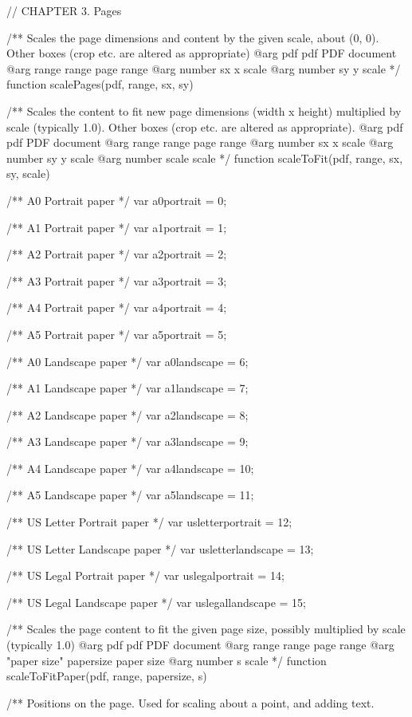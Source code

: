 // CHAPTER 3. Pages

/** Scales the page dimensions and content by the given scale, about (0, 0).
Other boxes (crop etc. are altered as appropriate)
@arg {pdf} pdf PDF document
@arg {range} range page range
@arg {number} sx x scale
@arg {number} sy y scale */
function scalePages(pdf, range, sx, sy) {}

/** Scales the content to fit new page dimensions (width x height) multiplied
by scale (typically 1.0). Other boxes (crop etc. are altered as appropriate).
@arg {pdf} pdf PDF document
@arg {range} range page range
@arg {number} sx x scale
@arg {number} sy y scale
@arg {number} scale scale */
function scaleToFit(pdf, range, sx, sy, scale) {}

/** A0 Portrait paper */
var a0portrait = 0;

/** A1 Portrait paper */
var a1portrait = 1;

/** A2 Portrait paper */
var a2portrait = 2;

/** A3 Portrait paper */
var a3portrait = 3;

/** A4 Portrait paper */
var a4portrait = 4;

/** A5 Portrait paper */
var a5portrait = 5;

/** A0 Landscape paper */
var a0landscape = 6;

/** A1 Landscape paper */
var a1landscape = 7;

/** A2 Landscape paper */
var a2landscape = 8;

/** A3 Landscape paper */
var a3landscape = 9;

/** A4 Landscape paper */
var a4landscape = 10;

/** A5 Landscape paper */
var a5landscape = 11;

/** US Letter Portrait paper */
var usletterportrait = 12;

/** US Letter Landscape paper */
var usletterlandscape = 13;

/** US Legal Portrait paper */
var uslegalportrait = 14;

/** US Legal Landscape paper */
var uslegallandscape = 15;

/** Scales the page content to fit the given page size, possibly multiplied by
scale (typically 1.0)
@arg {pdf} pdf PDF document
@arg {range} range page range
@arg {"paper size"} papersize paper size
@arg {number} s scale */
function scaleToFitPaper(pdf, range, papersize, s) {}

/** Positions on the page. Used for scaling about a point, and adding text.

